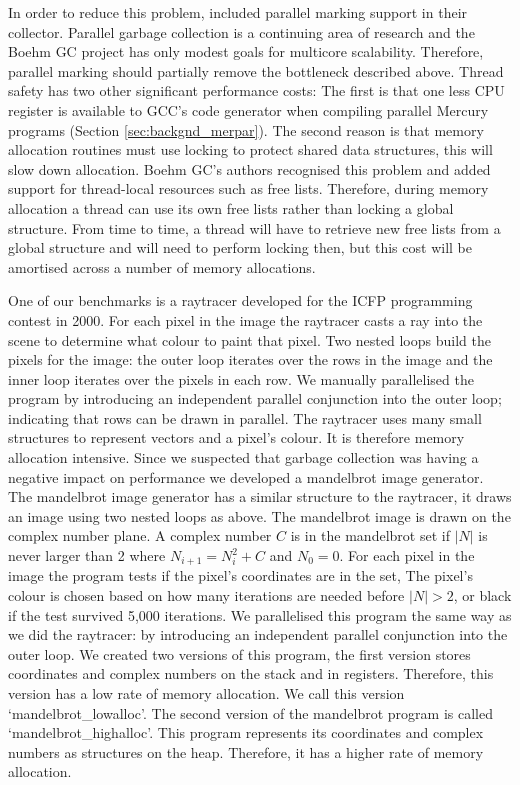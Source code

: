 In order to reduce this problem,
\citet{boehm-gc} included parallel marking support in their collector.
Parallel garbage collection is a continuing area of research
and the Boehm GC project has only modest goals for multicore scalability.
Therefore,
parallel marking should partially remove the bottleneck described above.
Thread safety has two other significant performance costs:
The first is that
one less CPU register is available to GCC's code generator when compiling
parallel Mercury programs (Section \ref{sec:backgnd_merpar}).
The second reason is that
memory allocation routines must use locking to protect shared data
structures,
this will slow down allocation.
Boehm GC's authors recognised this problem and
added support for thread-local resources such as free lists.
Therefore,
during memory allocation a thread can use its own free lists rather than
locking a global structure.
From time to time, a thread will have to retrieve new free lists
from a global structure and will need to perform locking then,
but this cost will be amortised across a number of memory allocations.

One of our benchmarks is a raytracer developed for the
ICFP programming contest in 2000.
For each pixel in the image the raytracer casts a ray into the scene to
determine what colour to paint that pixel.
Two nested loops build the pixels for the image:
the outer loop iterates over the rows in the image and
the inner loop iterates over the pixels in each row.
We manually parallelised the program by introducing an independent parallel
conjunction into the outer loop;
indicating that rows can be drawn in parallel.
The raytracer uses many small structures to represent vectors and a pixel's
colour.
It is therefore memory allocation intensive.
Since we suspected that garbage collection was having a negative impact on
performance we developed a mandelbrot image generator.
The mandelbrot image generator has a similar structure to the raytracer,
it draws an image using two nested loops as above.
The mandelbrot image is drawn on the complex number plane.
A complex number $C$ is in the mandelbrot set if
$|N|$ is never larger than 2 where $N_{i+1} = N_{i}^2 + C$ and $N_0 = 0$.
For each pixel in the image the program tests if the pixel's coordinates are
in the set,
The pixel's colour is chosen based on how many iterations are needed
before $|N| > 2$,
or black if the test survived 5,000 iterations.
We parallelised this program the same way as we did the raytracer:
by introducing an independent parallel conjunction into the outer loop.
We created two versions of this program,
the first version stores coordinates and complex numbers on the stack and in
registers.
Therefore, this version has a low rate of memory allocation.
We call this version `mandelbrot\_lowalloc'.
The second version of the mandelbrot program is called
`mandelbrot\_highalloc'.
This program represents its coordinates and complex numbers as structures on
the heap.
Therefore,
it has a higher rate of memory allocation.

